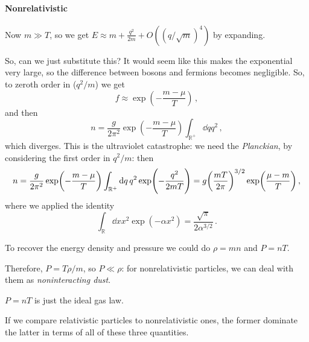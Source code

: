 \documentclass[main.tex]{subfiles}
\begin{document}
\paragraph{Nonrelativistic}

Now \(m \gg T\), so we get \(E \approx m + \frac{q^2}{2m} + O((q/\sqrt{m})^{4})\) by expanding.

So, can we just substitute this? It would seem like this makes the exponential very large, so the difference between bosons and fermions becomes negligible. So, to zeroth order in (\(q^2/m\)) we get 
%
\begin{equation}
  f \approx \exp(-\frac{m- \mu }{T}) 
\,,
\end{equation}
%
and then 
%
\begin{equation}
  n = \frac{g}{2 \pi^2} \exp(-\frac{m- \mu }{T}) \int _{\mathbb{R}^{+}} \dd{q}q^2 
\,,
\end{equation}
%
which diverges. This is the ultraviolet catastrophe: we need the \emph{Planckian}, by considering the first order in \(q^2/m\): then
%
\begin{equation}
    n = \frac{g}{2 \pi^2} \exp(-\frac{m- \mu }{T}) \int _{\mathbb{R}^{+}} \dd{q}q^2 \exp(-\frac{q^2}{2mT}) 
    = g \qty(\frac{mT}{2 \pi })^{3/2} \exp(\frac{\mu - m}{T}) 
  \,,
\end{equation}
where we applied the identity 
%
\begin{equation}
  \int _{\mathbb{R}} \dd{x} x^2 \exp(-\alpha x^2) = \frac{\sqrt{\pi } }{2 \alpha^{3/2}} 
\,.
\end{equation}
%

To recover the energy density and pressure we could do \(\rho = m n\) and \(P = n T\). 


Therefore, \(P = T \rho / m\), so \(P \ll \rho \): for nonrelativistic particles, we can deal with them as \emph{noninteracting dust}.

\(P = nT\) is just the ideal gas law.

If we compare relativistic particles to nonrelativistic ones, the former dominate the latter in terms of all of these three quantities.
\end{document}
